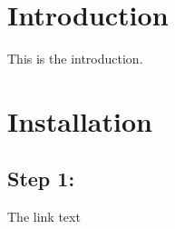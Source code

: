 \hypertarget{index_intro_sec}{}\section{Introduction}\label{index_intro_sec}
This is the introduction.\hypertarget{index_install_sec}{}\section{Installation}\label{index_install_sec}
\hypertarget{index_step1}{}\subsection{Step 1\+:}\label{index_step1}
The link text 
